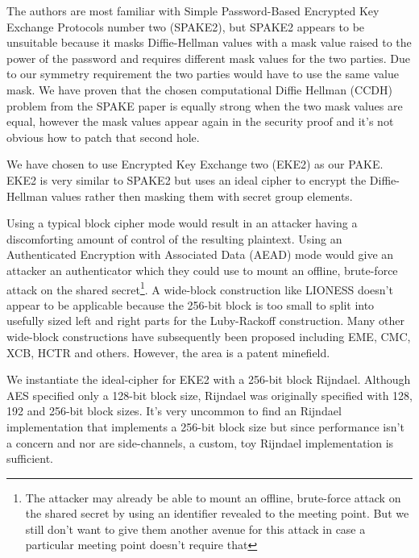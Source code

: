 \documentclass[letterpaper,twocolumn,10pt]{article}
\begin{document}
The authors are most familiar with Simple Password-Based Encrypted Key Exchange
Protocols number two (SPAKE2)\cite{abdalla2005simple}, but SPAKE2 appears to be
unsuitable because it masks Diffie-Hellman values with a mask value raised to
the power of the password and requires different mask values for the two
parties. Due to our symmetry requirement the two parties would have to use the
same value mask. We have proven that the chosen computational Diffie Hellman
(CCDH) problem from the SPAKE paper is equally strong when the two mask values
are equal, however the mask values appear again in the security proof and it's
not obvious how to patch that second hole.

We have chosen to use Encrypted Key Exchange two
(EKE2)\cite{bellare2000authenticated} as our PAKE. EKE2 is very similar to
SPAKE2 but uses an ideal cipher to encrypt the Diffie-Hellman values rather
then masking them with secret group elements.

Using a typical block cipher mode would
result in an attacker having a discomforting amount of control of the resulting
plaintext. Using an Authenticated Encryption with Associated Data (AEAD) mode would give an attacker an authenticator which
they could use to mount an offline, brute-force attack on the shared
secret\footnote{The attacker may already be able to mount an offline,
brute-force attack on the shared secret by using an identifier revealed to the
meeting point. But we still don't want to give them another avenue for this
attack in case a particular meeting point doesn't require that}. A wide-block
construction like LIONESS\cite{anderson1996two} doesn't appear to be
applicable because the 256-bit block is too small to split into usefully sized
left and right parts for the Luby-Rackoff construction. Many other wide-block
constructions have subsequently been proposed including
EME\cite{halevi2004parallelizable}, CMC\cite{halevi2004parallelizable},
XCB\cite{mcgrew2004extended}, HCTR\cite{wang2005hctr} and others. However, the
area is a patent minefield.

We instantiate the ideal-cipher for EKE2 with a 256-bit block
Rijndael\cite{daemen2002design}. Although AES specified only a 128-bit block
size, Rijndael was originally specified with 128, 192 and 256-bit block sizes.
It's very uncommon to find an Rijndael implementation that implements a 256-bit
block size but since performance isn't a concern and nor are side-channels, a
custom, toy Rijndael implementation is sufficient.
\end{document}
